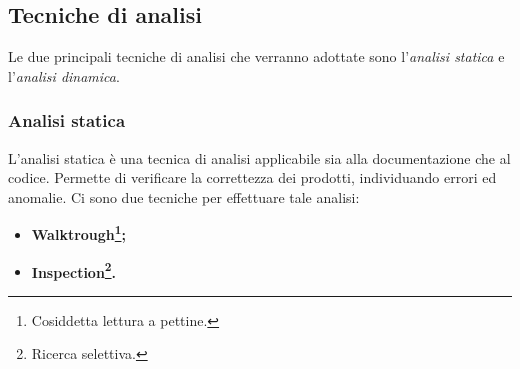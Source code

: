 \subsection{Tecniche di analisi}
Le due principali tecniche di analisi che verranno adottate sono l'\textit{analisi statica} e l'\textit{analisi dinamica}.
	\subsubsection{Analisi statica}
	L'analisi statica è una tecnica di analisi applicabile sia alla documentazione che al codice. Permette di verificare la correttezza dei prodotti, individuando errori ed anomalie. Ci sono due tecniche per effettuare tale analisi:
	\begin{itemize}
		\item \textbf{Walktrough\footnote{Cosiddetta lettura a pettine.};}
		\item \textbf{Inspection\footnote{Ricerca selettiva.}.}
	\end{itemize}
	
